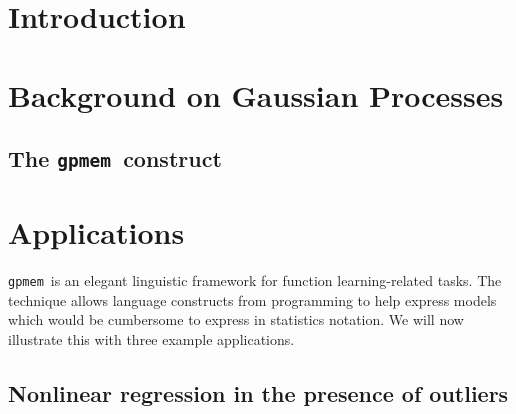 \documentclass[twoside,11pt]{article}
\newcommand{\gpmem}{\texttt{gpmem}}
\newcommand{\myparagraph}[1]{\paragraph{#1}\mbox{}\\}
\begin{document}
\section{Introduction}

%
%

%

\section{Background on Gaussian Processes}


%

\subsection{The \gpmem\ construct}


%


\newpage
\section{Applications}
\gpmem\ is an elegant linguistic framework for function learning-related tasks.
The technique allows language constructs from programming to help express models
which would be cumbersome to express in statistics notation.
We will now illustrate this with three example applications. 

\subsection{Nonlinear regression in the presence of outliers}

%
\end{document}
